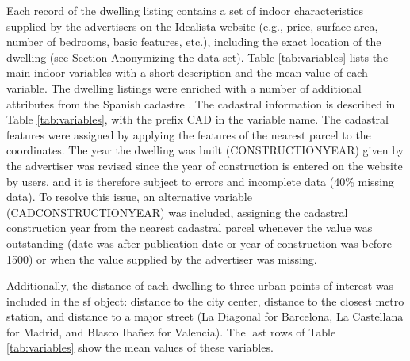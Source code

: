 \documentclass[Royal,times,sageh]{sagej}
\begin{document}
Each record of the dwelling listing contains a set of indoor
characteristics supplied by the advertisers on the Idealista website
(e.g., price, surface area, number of bedrooms, basic features, etc.),
including the exact location of the dwelling (see Section
\protect\hyperlink{anonymizing}{Anonymizing the data set}). Table
\ref{tab:variables} lists the main indoor variables with a short
description and the mean value of each variable. The dwelling listings
were enriched with a number of additional attributes from the Spanish
cadastre \citep{Catastro}. The cadastral information is described in
Table \ref{tab:variables}, with the prefix CAD in the variable name. The
cadastral features were assigned by applying the features of the nearest
parcel to the coordinates. The year the dwelling was built
(CONSTRUCTIONYEAR) given by the advertiser was revised since the year of
construction is entered on the website by users, and it is therefore
subject to errors and incomplete data (40\% missing data). To resolve
this issue, an alternative variable (CADCONSTRUCTIONYEAR) was included,
assigning the cadastral construction year from the nearest cadastral
parcel whenever the value was outstanding (date was after publication
date or year of construction was before 1500) or when the value supplied
by the advertiser was missing.

Additionally, the distance of each dwelling to three urban points of
interest was included in the sf object: distance to the city center,
distance to the closest metro station, and distance to a major street
(La Diagonal for Barcelona, La Castellana for Madrid, and Blasco Ibañez
for Valencia). The last rows of Table \ref{tab:variables} show the mean
values of these variables.
\end{document}
